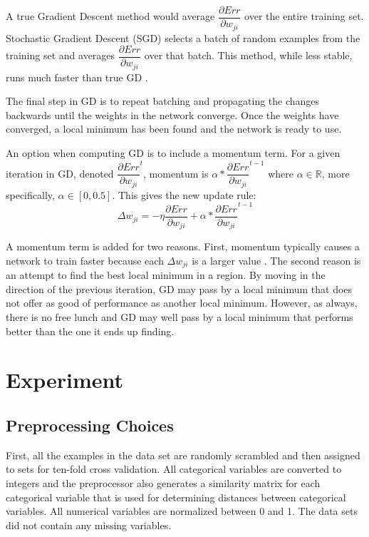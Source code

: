 \documentclass[twoside,11pt]{article}
\begin{document}
A true Gradient Descent method would average $\dfrac{\partial Err}{\partial w_{ji}}$ over the entire training set. Stochastic Gradient Descent (SGD) selects a batch of random examples from the training set and averages $\dfrac{\partial Err}{\partial w_{ji}}$ over that batch. This method, while less stable, runs much faster than true GD \citep{svozil1997ffnn}.

The final step in GD is to repeat batching and propagating the changes backwards until the weights in the network converge. Once the weights have converged, a local minimum has been found and the network is ready to use.

An option when computing GD is to include a momentum term. For a given iteration in GD, denoted 
$\dfrac{\partial Err}{\partial w_{ji}}^t$, momentum is $\alpha * \dfrac{\partial Err}{\partial w_{ji}}^{t-1}$ where $\alpha \in \mathbb{R}$, more specifically, $\alpha \in [0,0.5]$.
This gives the new update rule: 
$$\Delta w_{ji} = - \eta \dfrac{\partial Err}{\partial w_{ji}} + \alpha * \dfrac{\partial Err}{\partial w_{ji}}^{t-1}$$

A momentum term is added for two reasons. First, momentum typically causes a network to train faster because each $\Delta w_{ji}$ is a larger value \citep{rumelhart1988learning}.
The second reason is an attempt to find the best local minimum in a region. 
By moving in the direction of the previous iteration, GD may pass by a local minimum that does not offer as good of performance as another local minimum. 
However, as always, there is no free lunch and GD may well pass by a local minimum that performs better than the one it ends up finding.

\section{Experiment}

\subsection{Preprocessing Choices}
First, all the examples in the data set are randomly scrambled and then assigned to sets
for ten-fold cross validation. All categorical variables are converted to integers and the
preprocessor also generates a similarity matrix for each categorical variable that is used for
determining distances between categorical variables. All numerical variables are normalized
between 0 and 1. The data sets did not contain any missing variables.
\end{document}
